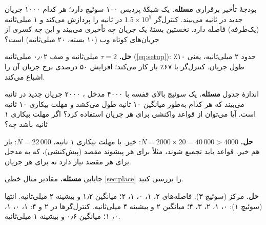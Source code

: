 \documentclass[11pt,a4paper]{article}
\begin{document}
\begin{examplebox}{بودجهٔ تأخیر برقراری}\label{ex:setup}
\textbf{مسئله.} یک شبکهٔ پردیس ۱۰۰ سوئیچ دارد؛ هر کدام ۱۰۰۰ جریان جدید در ثانیه می‌بیند. کنترل‌گر $1.5\times10^5$
 در ثانیه را پردازش می‌کند و ۱ میلی‌ثانیه (یک‌طرفه) فاصله دارد. نخستین بستهٔ یک جریان چه تأخیری می‌بیند و این چه
کسری از جریان‌های کوتاه وب (۱۰ بسته، ۲۰ میلی‌ثانیه) است؟

\textbf{حل.} $\tau = 2$ میلی‌ثانیه و صف ۰٫۰۲ میلی‌ثانیه (\cref{eq:setup}): حدود ۲ میلی‌ثانیه، یعنی ۱۰٪ طول جریان. کنترل‌گر با
۶۷٪ بار کار می‌کند؛ افزایش ۵۰ درصدی نرخ جریان آن را اشباع می‌کند.
\end{examplebox}

\begin{examplebox}{اندازهٔ جدول}\label{ex:table}
\textbf{مسئله.} یک سوئیچ بالای قفسه با ۴۰۰۰ مدخل ، ۲۰۰۰ جریان جدید در ثانیه می‌بیند که هر کدام به‌طور میانگین ۱۰
ثانیه طول می‌کشد و مهلت بیکاری ۱۰ ثانیه است. آیا می‌توان از قواعد واکنشی برای هر جریان استفاده کرد؟ اگر مهلت بیکاری ۱ ثانیه
باشد چه؟

\textbf{حل.} $\bar N = 2000\times20 = 40\,000 > 4000$: خیر. با مهلت بیکاری ۱ ثانیه، $\bar N = 22\,000$: باز هم خیر. قواعد باید
تجمیع شوند، مثلاً برای هر پیشوند مقصد (پیش‌کنشی)، که به مدخل برای هر مقصد نیاز دارد نه برای هر جریان.
\end{examplebox}

\begin{examplebox}{جایابی}\label{ex:place}
\textbf{مسئله.} مقادیر مثال خطی \cref{sec:place} را بررسی کنید.

\textbf{حل.} مرکز (سوئیچ ۳): فاصله‌های ۲، ۱، ۰، ۱، ۲؛ میانگین ۱٫۲ و بیشینه ۲ میلی‌ثانیه. انتها (سوئیچ ۱): ۰، ۱، ۲، ۳، ۴؛ میانگین ۲ و
بیشینه ۴ میلی‌ثانیه. کنترل‌گرها در ۲ و ۴: ۱، ۰، ۱، ۰، ۱؛ میانگین ۰٫۶ و بیشینه ۱ میلی‌ثانیه.
\end{examplebox}

\end{document}
